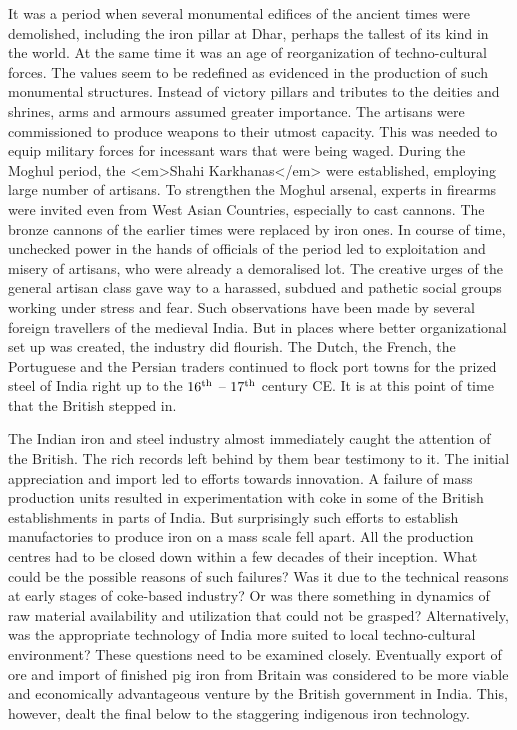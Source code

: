 It was a period when several monumental edifices of the ancient times were demolished, including the iron pillar at Dhar, perhaps the tallest of its kind in the world. At the same time it was an age of reorganization of techno-cultural forces. The values seem to be redefined as evidenced in the production of such monumental structures. Instead of victory pillars and tributes to the deities and shrines, arms and armours assumed greater importance. The artisans were commissioned to produce weapons to their utmost capacity. This was needed to equip military forces for incessant wars that were being waged. During the Moghul period, the <em>Shahi Karkhanas</em> were established, employing large number of artisans. To strengthen the Moghul arsenal, experts in firearms were invited even from West Asian Countries, especially to cast cannons. The bronze cannons of the earlier times were replaced by iron ones. In course of time, unchecked power in the hands of officials of the period led to exploitation and misery of artisans, who were already a demoralised lot. The creative urges of the general artisan class gave way to a harassed, subdued and pathetic social groups working under stress and fear. Such observations have been made by several foreign travellers of the medieval India. But in places where better organizational set up was created, the industry did flourish. The Dutch, the French, the Portuguese and the Persian traders continued to flock port towns for the prized steel of India right up to the $16^{\rm th}$ – $17^{\rm th}$ century CE. It is at this point of time that the British stepped in.

The Indian iron and steel industry almost immediately caught the attention of the British. The rich records left behind by them bear testimony to it. The initial appreciation and import led to efforts towards innovation. A failure of mass production units resulted in experimentation with coke in some of the British establishments in parts of India. But surprisingly such efforts to establish manufactories to produce iron on a mass scale fell apart. All the production centres had to be closed down within a few decades of their inception. What could be the possible reasons of such failures? Was it due to the technical reasons at early stages of coke-based industry? Or was there something in dynamics of raw material availability and utilization that could not be grasped? Alternatively, was the appropriate technology of India more suited to local techno-cultural environment? These questions need to be examined closely. Eventually export of ore and import of finished pig iron from Britain was considered to be more viable and economically advantageous venture by the British government in India. This, however, dealt the final below to the staggering indigenous iron technology.

